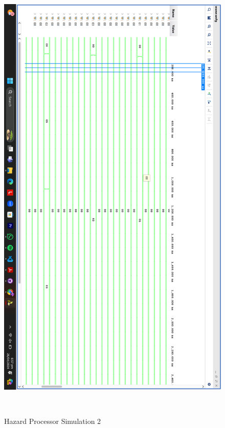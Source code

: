 \documentclass{report}
\begin{document}
  \begin{figure}[h!]
    \centerline{\includegraphics[scale = 0.2]{Hazard 2.png}}
    \caption{Hazard Processor Simulation 2}

  \end{figure}
\end{document}
